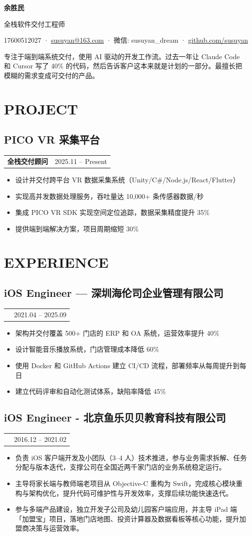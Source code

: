 \documentclass[11pt,a4paper]{article}
\makeatletter
\newcommand{\Header}[4]{
  {\LARGE\bfseries #1}\par
  {\normalsize #2}\par
  \vspace{0.25em}
  {\small #3}\par
  {\small #4}\par
  \vspace{0.6em}
}
\newcommand{\RoleLine}[3]{
  \begin{tabularx}{\textwidth}{@{}X r@{}}
    \textbf{#1} & #3 \\
  \end{tabularx}
  {\small #2}\par
}
\makeatother
\begin{document}
\Header
  {余胜民}
  {全栈软件交付工程师}
  {17600512027 · \href{mailto:susuyan@163.com}{susuyan@163.com} · 微信: susuyan\_dream · \href{https://github.com/susuyan}{github.com/susuyan}}
  {专注于端到端系统交付，使用 AI 驱动的开发工作流。过去一年让 Claude Code 和 Cursor 写了 40\% 的代码，然后告诉客户这本来就是计划的一部分。最擅长把模糊的需求变成可交付的产品。}

\section*{PROJECT}
\subsection*{PICO VR 采集平台}
\RoleLine{全栈交付顾问}{}{2025.11 -- Present}
\begin{itemize}
  \item 设计并交付跨平台 VR 数据采集系统（Unity/C\#/Node.js/React/Flutter）
  \item 实现高并发数据处理服务，吞吐量达 10,000+ 条传感器数据/秒
  \item 集成 PICO VR SDK 实现空间定位追踪，数据采集精度提升 35\%
  \item 提供端到端解决方案，项目周期缩短 30\%
\end{itemize}

\section*{EXPERIENCE}
\subsection*{iOS Engineer — 深圳海伦司企业管理有限公司}
\RoleLine{}{}{2021.04 -- 2025.09}
\begin{itemize}
  \item 架构并交付覆盖 500+ 门店的 ERP 和 OA 系统，运营效率提升 40\%
  \item 设计智能音乐播放系统，门店管理成本降低 60\%
  \item 使用 Docker 和 GitHub Actions 建立 CI/CD 流程，部署频率从每周提升到每日
  \item 建立代码评审和自动化测试体系，缺陷率降低 45\%
\end{itemize}
\subsection*{iOS Engineer - 北京鱼乐贝贝教育科技有限公司}
\RoleLine{}{}{2016.12 -- 2021.02}
\begin{itemize}
  \item 负责 iOS 客户端开发及小团队（3–4 人）技术推进，参与业务需求拆解、任务分配与版本迭代，支撑公司在全国近两千家门店的业务系统稳定运行。
  \item 主导将家长端与教师端老项目从 Objective-C 重构为 Swift，完成核心模块重构与架构优化，提升代码可维护性与开发效率，支撑后续功能快速迭代。
  \item 参与多端产品建设，独立开发子公司及幼儿园客户端应用，并主导 iPad 端「加盟宝」项目，落地门店地图、投资计算器及数据看板等核心功能，提升加盟商决策与运营效率。
\end{itemize}
\end{document}
